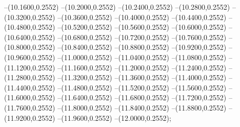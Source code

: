 {	--(10.1600,0.2552)
	--(10.2000,0.2552)
	--(10.2400,0.2552)
	--(10.2800,0.2552)
	--(10.3200,0.2552)
	--(10.3600,0.2552)
	--(10.4000,0.2552)
	--(10.4400,0.2552)
	--(10.4800,0.2552)
	--(10.5200,0.2552)
	--(10.5600,0.2552)
	--(10.6000,0.2552)
	--(10.6400,0.2552)
	--(10.6800,0.2552)
	--(10.7200,0.2552)
	--(10.7600,0.2552)
	--(10.8000,0.2552)
	--(10.8400,0.2552)
	--(10.8800,0.2552)
	--(10.9200,0.2552)
	--(10.9600,0.2552)
	--(11.0000,0.2552)
	--(11.0400,0.2552)
	--(11.0800,0.2552)
	--(11.1200,0.2552)
	--(11.1600,0.2552)
	--(11.2000,0.2552)
	--(11.2400,0.2552)
	--(11.2800,0.2552)
	--(11.3200,0.2552)
	--(11.3600,0.2552)
	--(11.4000,0.2552)
	--(11.4400,0.2552)
	--(11.4800,0.2552)
	--(11.5200,0.2552)
	--(11.5600,0.2552)
	--(11.6000,0.2552)
	--(11.6400,0.2552)
	--(11.6800,0.2552)
	--(11.7200,0.2552)
	--(11.7600,0.2552)
	--(11.8000,0.2552)
	--(11.8400,0.2552)
	--(11.8800,0.2552)
	--(11.9200,0.2552)
	--(11.9600,0.2552)
	--(12.0000,0.2552);
}
